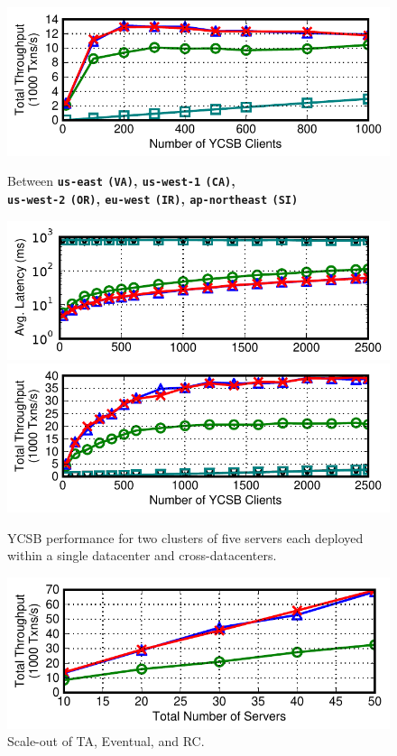 \begin{figure}[t!]
\includegraphics[width=0.90\columnwidth]{figs/finals/2wan-threads-thru.pdf}
\begin{center}\small Between \textbf{\texttt{us-east} \texttt{(VA)}, \texttt{us-west-1} \texttt{(CA)},\\ \texttt{us-west-2} \texttt{(OR)}, \texttt{eu-west} \texttt{(IR)}, \texttt{ap-northeast} \texttt{(SI)}}\end{center}\vspace{-1.5em}
\includegraphics[width=0.90\columnwidth]{figs/finals/5wan-threads-lats-log.pdf}\vspace{--.5em}
\includegraphics[width=0.90\columnwidth]{figs/finals/5wan-threads-thru.pdf}
\caption{YCSB performance for two clusters of five servers each
  deployed within a single datacenter and cross-datacenters.}
\label{fig:wan-exp}
\end{figure}

\begin{figure}[t!]
\begin{center}
\includegraphics[width=0.90\columnwidth]{figs/finals/scaleout-thru.pdf}
\end{center}\vspace{-2em}
\caption{Scale-out of TA, Eventual, and RC.}
\label{fig:scaleout}
\end{figure}

